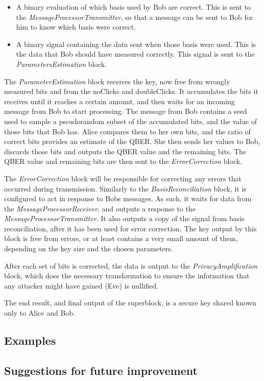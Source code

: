 \begin{itemize}
	\item A binary evaluation of which basis used 
	by Bob are correct. This is sent to the \textit{MessageProcessorTransmitter}, 
	so that a message can be sent to Bob for him to know which basis were correct.
	\item A binary signal containing the data sent when those basis were used. 
	This is the data that Bob should have measured correctly. This signal is sent 
	to the \textit{ParametersEstimation} block.
\end{itemize} 

The \textit{ParameterEstimation} block receives the key, now free from wrongly
measured bits and from the noClicks and doubleClicks. It accumulates the bits it
receives until it reaches a certain amount, and then waits for an incoming
message from Bob to start processing. The message from Bob contains a seed used
to sample a pseudorandom subset of the accumulated bits, and the value of those
bits that Bob has. Alice compares them to her own bits, and the ratio of correct
bits provides an estimate of the QBER. She then sends her values to Bob, discards
those bits and outputs the QBER value and the remaining bits. The QBER value and
remaining bits are then sent to the \textit{ErrorCorrection} block.

The \textit{ErrorCorrection} block will be responsible for correcting any 
errors that occurred during transmission. Similarly to the 
\textit{BasisReconciliation} block, it is configured to act in response to Bobs 
messages. As such, it waits for data from the 
\textit{MessageProcessorReceiver}, and outputs a response to the 
\textit{MessageProcessorTransmitter}. It also outputs a copy of the 
signal from basis reconciliation, after it has been used for error correction. 
The key output by this block is free from errors, or at least contains a very
small amount of them, depending on the key size and the chosen parameters.


After each set of bits is corrected, the data is output to the 
\textit{PrivacyAmplification} block, which does the necessary transformation to 
ensure the information that any attacker might have gained (Eve) is nullified.

The end result, and final output of the superblock, is a secure key 
shared known only to Alice and Bob.

\subsection*{Examples}

\subsection*{Suggestions for future improvement}